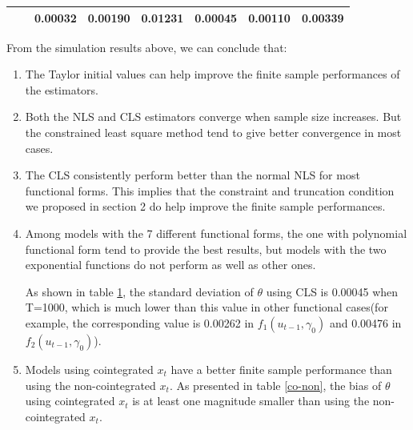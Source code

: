 \documentclass[a4paper,12pt,times,numbered,print,index]{report}
\numberwithin{equation}{section}
\begin{document}
\begin{table}[htbp]
\begin{adjustbox}{max width=\textwidth}
\begin{tabular}{cccccccccccccccc}
          &       & \multicolumn{2}{c}{0.00032} & \multicolumn{2}{c}{\textcolor[rgb]{ .329,  .51,  .208}{0.00190}} & \multicolumn{3}{c}{\textcolor[rgb]{ .329,  .51,  .208}{0.01231}} & \multicolumn{2}{c}{0.00045} & \multicolumn{2}{c}{\textcolor[rgb]{ .329,  .51,  .208}{0.00110}} & \multicolumn{3}{c}{\textcolor[rgb]{ .329,  .51,  .208}{0.00339}} \\
    \bottomrule
    \bottomrule
    \end{tabular}%
    \end{adjustbox}
  \label{s_f7}%
\end{table}%

From the simulation results above, we can conclude that:
\begin{enumerate}
    \item The Taylor initial values can help improve the finite sample performances of the estimators.
    
    \item Both the NLS and CLS estimators converge when sample size increases. But the constrained least square method tend to give better convergence in most cases.
    
    \item The CLS consistently perform better than the normal NLS for most functional forms. This implies that the constraint and truncation condition we proposed in section 2 do help improve the finite sample performances. 
    
    \item Among models with the 7 different functional forms, the one with polynomial functional form tend to provide the best results, but models with the two exponential functions do not perform as well as other ones.
    
    As shown in table \ref{s_f7}, the standard deviation of $\theta$ using CLS is 0.00045 when T=1000, which is much lower than this value in other functional cases(for example, the corresponding value is 0.00262 in $f_1(u_{t-1}, \gamma_0)$ and 0.00476 in $f_2(u_{t-1}, \gamma_0)$). 
    
    \item Models using cointegrated $x_t$ have a better finite sample performance than using the non-cointegrated $x_t$. As presented in table \ref{co-non}, the bias of $\theta$ using cointegrated $x_t$ is at least one magnitude smaller than using the non-cointegrated $x_t$. 
\end{enumerate}
\end{document}
